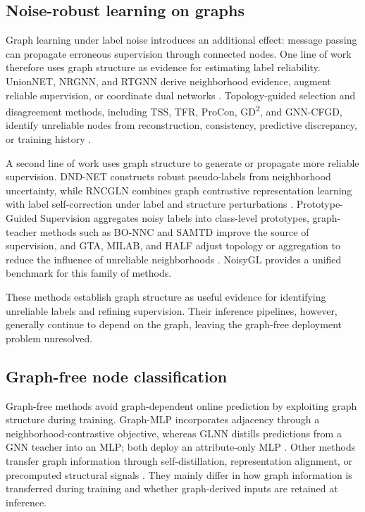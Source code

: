 \documentclass[10pt,letterpaper]{elsarticle}
\begin{document}
\subsection{Noise-robust learning on graphs}\label{sec:2.2}

Graph learning under label noise introduces an additional effect: message passing can propagate erroneous supervision through connected nodes. One line of work therefore uses graph structure as evidence for estimating label reliability. UnionNET, NRGNN, and RTGNN derive neighborhood evidence, augment reliable supervision, or coordinate dual networks \cite{ref9,ref10,ref46}. Topology-guided selection and disagreement methods, including TSS, TFR, ProCon, GD\textsuperscript{2}, and GNN-CFGD, identify unreliable nodes from reconstruction, consistency, predictive discrepancy, or training history \cite{ref40,ref41,ref42,ref44,ref47}.

A second line of work uses graph structure to generate or propagate more reliable supervision. DND-NET constructs robust pseudo-labels from neighborhood uncertainty, while RNCGLN combines graph contrastive representation learning with label self-correction under label and structure perturbations \cite{ref11,ref12}. Prototype-Guided Supervision aggregates noisy labels into class-level prototypes, graph-teacher methods such as BO-NNC and SAMTD improve the source of supervision, and GTA, MILAB, and HALF adjust topology or aggregation to reduce the influence of unreliable neighborhoods \cite{ref45,ref50,ref51,ref58,ref59,ref63}. NoisyGL \cite{ref13} provides a unified benchmark for this family of methods.

These methods establish graph structure as useful evidence for identifying unreliable labels and refining supervision. Their inference pipelines, however, generally continue to depend on the graph, leaving the graph-free deployment problem unresolved.

\subsection{Graph-free node classification}\label{sec:2.3}

Graph-free methods avoid graph-dependent online prediction by exploiting graph structure during training. Graph-MLP incorporates adjacency through a neighborhood-contrastive objective, whereas GLNN distills predictions from a GNN teacher into an MLP; both deploy an attribute-only MLP \cite{ref3,ref4}. Other methods transfer graph information through self-distillation, representation alignment, or precomputed structural signals \cite{ref5,ref14,ref15,ref27,ref33}. They mainly differ in how graph information is transferred during training and whether graph-derived inputs are retained at inference.
\end{document}
